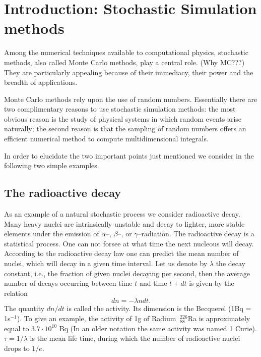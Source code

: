 \chapter{Introduction: Stochastic Simulation methods}

Among the numerical techniques available to computational physics,
stochastic methods, also called Monte Carlo methods, play a 
central role. (Why MC???) They are particularly appealing because of their 
immediacy, their power and the breadth of applications.

Monte Carlo methods rely upon the use of random 
numbers. Essentially there are two complimentary reasons to use
stochastic simulation methods:
the most obvious reason is the study of physical systems in 
which random events arise naturally; the second reason is that the 
sampling of random numbers offers an efficient numerical method 
to compute multidimensional integrals.

In order to elucidate the two important points just mentioned
we consider in the following two simple examples.

\section{The radioactive decay}
As an example of a natural stochastic process we consider radioactive decay.
Many  heavy nuclei are intrinsically unstable and decay to 
lighter, more stable elements
under the emission of $\alpha$--, $\beta$--, or 
$\gamma$--radiation. The radioactive decay is a statistical 
process. One can not forsee at what time the next nucleous will 
decay. According to the radioactive decay law one can predict the 
mean number of nuclei, which will decay in a given time interval.
Let us denote by $\lambda$ the decay constant, i.e., the fraction 
of given nuclei decaying per second, then the average number of 
decays occurring between time $t$ and time $t+dt$ is given by the 
relation
\begin{equation}\label{DECAY_LAW}
  dn = -\lambda n dt.
\end{equation}
The quantity $dn/dt$ is called the activity. Its dimension is the 
Becquerel (1Bq = 1s$^{-1}$). To give an example, the activity of 
1g of Radium $~^{226}_{88}$Ra is approximately equal to
$3.7 \cdot 10^{10}$ Bq (In an older notation the same activity was 
named 1 Curie). $\tau=1/\lambda$ is the mean life time, during 
which the number of radioactive nuclei drops to $1/e$.

